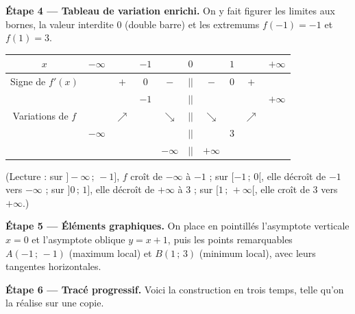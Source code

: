 \documentclass[11pt]{article}
\begin{document}
\textbf{Étape 4 — Tableau de variation enrichi.} On y fait figurer les limites aux bornes, la valeur interdite $0$ (double barre) et les extremums $f(-1) = -1$ et $f(1) = 3$.

\begin{center}
\begin{tabular}{|c|ccccccccc|}
\hline
\rowcolor{popblueL}
$x$ & $-\infty$ & & $-1$ & & $0$ & & $1$ & & $+\infty$ \\
\hline
Signe de $f'(x)$ & & $+$ & $0$ & $-$ & $||$ & $-$ & $0$ & $+$ & \\
\hline
 & & & $-1$ & & $||$ & & & & $+\infty$ \\
Variations de $f$ & & $\nearrow$ & & $\searrow$ & $||$ & $\searrow$ & & $\nearrow$ & \\
 & $-\infty$ & & & & $||$ & & $3$ & & \\
 & & & & $-\infty$ & $||$ & $+\infty$ & & & \\
\hline
\end{tabular}
\end{center}

(Lecture : sur $]-\infty\,;\,-1]$, $f$ croît de $-\infty$ à $-1$ ; sur $[-1\,;\,0[$, elle décroît de $-1$ vers $-\infty$ ; sur $]0\,;\,1]$, elle décroît de $+\infty$ à $3$ ; sur $[1\,;\,+\infty[$, elle croît de $3$ vers $+\infty$.)

\textbf{Étape 5 — Éléments graphiques.} On place en pointillés l'asymptote verticale $x = 0$ et l'asymptote oblique $y = x+1$, puis les points remarquables $A(-1\,;\,-1)$ (maximum local) et $B(1\,;\,3)$ (minimum local), avec leurs tangentes horizontales.

\textbf{Étape 6 — Tracé progressif.} Voici la construction en trois temps, telle qu'on la réalise sur une copie.
\end{document}
